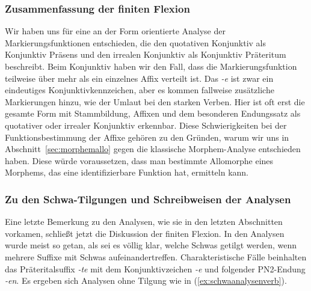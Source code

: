 
\subsubsection{Zusammenfassung der finiten Flexion}


Wir haben uns für eine an der Form orientierte Analyse der Markierungsfunktionen entschieden, die den quotativen Konjunktiv als Konjunktiv Präsens und den irrealen Konjunktiv als Konjunktiv Präteritum beschreibt.
Beim Konjunktiv haben wir den Fall, dass die Markierungsfunktion teilweise über mehr als ein einzelnes Affix verteilt ist.
Das \textit{-e} ist zwar ein eindeutiges Konjunktivkennzeichen, aber es kommen fallweise zusätzliche Markierungen hinzu, wie \zB der Umlaut bei den starken Verben.
Hier ist oft erst die gesamte Form mit Stammbildung, Affixen und dem besonderen Endungssatz als quotativer oder irrealer Konjunktiv erkennbar.
Diese Schwierigkeiten bei der Funktionsbestimmung der Affixe gehören zu den Gründen, warum wir uns in Abschnitt~\ref{sec:morphemallo} gegen die klassische Morphem-Analyse entschieden haben.
Diese würde voraussetzen, dass man bestimmte Allomorphe eines Morphems, das eine identifizierbare Funktion hat, ermitteln kann.

\subsubsection{Zu den Schwa-Tilgungen und Schreibweisen der Analysen}

\label{sec:schwatilgungverb}


Eine letzte Bemerkung zu den Analysen, wie sie in den letzten Abschnitten vorkamen, schließt jetzt die Diskussion der finiten Flexion.
In den Analysen wurde meist so getan, als sei es völlig klar, welche Schwas getilgt werden, wenn mehrere Suffixe mit Schwas aufeinandertreffen.
Charakteristische Fälle beinhalten das Präteritalsuffix \textit{-te} mit dem Konjunktivzeichen \textit{-e} und folgender PN2-Endung \textit{-en}.
Es ergeben sich Analysen ohne Tilgung wie in (\ref{ex:schwaanalysenverb}).

\begin{exe}
  \ex\label{ex:schwaanalysenverb}
  \begin{xlist}
  \end{xlist}
\end{exe}

